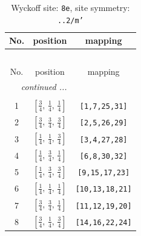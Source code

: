 \documentclass[fleqn,8pt]{jsarticle}
\begin{document}
\renewcommand{\arraystretch}{1.2}
\begin{longtable}{ccc}
\caption{Wyckoff site: {\tt 8e}, site symmetry: {\tt ..2/m'}}
 \\
 \hline \hline
No. & position & mapping \\ \hline \endfirsthead

\multicolumn{2}{l}{\tablename\ \thetable{}} \\
 \hline \hline
No. & position & mapping \\ \hline \endhead

 \hline \hline
\multicolumn{2}{r}{\footnotesize\it continued ...} \\ \endfoot

 \hline \hline
\multicolumn{2}{r}{} \\ \endlastfoot

1 & $\left[ \frac{3}{4},\, \frac{1}{4},\, \frac{1}{4} \right]$ & {\tt [1,7,25,31]} \\ \hline
2 & $\left[ \frac{3}{4},\, \frac{3}{4},\, \frac{3}{4} \right]$ & {\tt [2,5,26,29]} \\ \hline
3 & $\left[ \frac{1}{4},\, \frac{1}{4},\, \frac{3}{4} \right]$ & {\tt [3,4,27,28]} \\ \hline
4 & $\left[ \frac{1}{4},\, \frac{3}{4},\, \frac{1}{4} \right]$ & {\tt [6,8,30,32]} \\ \hline
5 & $\left[ \frac{1}{4},\, \frac{3}{4},\, \frac{3}{4} \right]$ & {\tt [9,15,17,23]} \\ \hline
6 & $\left[ \frac{1}{4},\, \frac{1}{4},\, \frac{1}{4} \right]$ & {\tt [10,13,18,21]} \\ \hline
7 & $\left[ \frac{3}{4},\, \frac{3}{4},\, \frac{1}{4} \right]$ & {\tt [11,12,19,20]} \\ \hline
8 & $\left[ \frac{3}{4},\, \frac{1}{4},\, \frac{3}{4} \right]$ & {\tt [14,16,22,24]} \\
\end{longtable}
\renewcommand{\arraystretch}{1.2}
\end{document}
